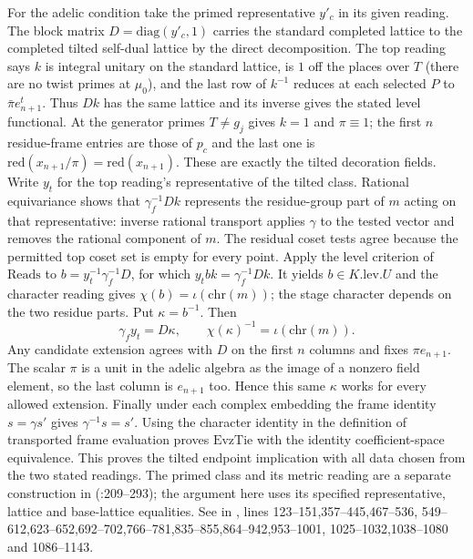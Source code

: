 For the adelic condition take the primed representative $y'_c$
in its given reading. The block matrix $D=\mathrm{diag}(y'_c,1)$
carries the standard completed lattice to the completed tilted
self-dual lattice by the direct decomposition. The top reading
says $k$ is integral unitary on the standard lattice, is $1$ off
the places over $T$ (there are no twist primes at $\mu_0$), and
the last row of $k^{-1}$ reduces at each selected $P$ to
$\bar\pi e_{n+1}^{t}$. Thus $Dk$ has the same lattice and its
inverse gives the stated level functional. At the generator
primes $T\ne g_j$ gives $k=1$ and $\pi\equiv1$; the first $n$
residue-frame entries are those of $p_c$ and the last one is
$\mathrm{red}(x_{n+1}/\pi)=\mathrm{red}(x_{n+1})$. These are
exactly the tilted decoration fields. Write $y_t$ for the top reading's
representative of the tilted class. Rational equivariance shows that
$\gamma_f^{-1}Dk$ represents the residue-group part of $m$ acting on
that representative: inverse rational transport applies $\gamma$ to
the tested vector and removes the rational component of $m$.
The residual coset tests agree because the permitted top coset set
is empty for every point. Apply the level criterion of $\mathrm{Reads}$
to $b=y_t^{-1}\gamma_f^{-1}D$, for which $y_t b k=\gamma_f^{-1}Dk$.
It yields $b\in K.\mathrm{lev}.U$ and the character reading gives
$\chi(b)=\iota(\mathrm{chr}(m))$; the stage character depends on
the two residue parts. Put $\kappa=b^{-1}$. Then
\[
 \gamma_f y_t=D\kappa,\qquad
 \chi(\kappa)^{-1}=\iota(\mathrm{chr}(m)).
\]
Any candidate extension agrees with $D$ on the first $n$ columns
and fixes $\pi e_{n+1}$. The scalar $\pi$ is a unit in the adelic
algebra as the image of a nonzero field element, so the last column
is $e_{n+1}$ too. Hence this same $\kappa$ works for every allowed
extension. Finally under each complex embedding the frame identity
$s=\gamma s'$ gives $\gamma^{-1}s=s'$. Using the character
identity in the definition of transported frame evaluation proves
$\mathrm{EvzTie}$ with the identity coefficient-space equivalence.
This proves the tilted endpoint implication with all data chosen from
the two stated readings. The primed class and its metric reading are
a separate construction in 
(:209--293); the argument here uses its
specified representative, lattice and base-lattice equalities.
See  in
, lines 123--151,357--445,467--536,
549--612,623--652,692--702,766--781,835--855,864--942,953--1001,
1025--1032,1038--1080 and 1086--1143.

